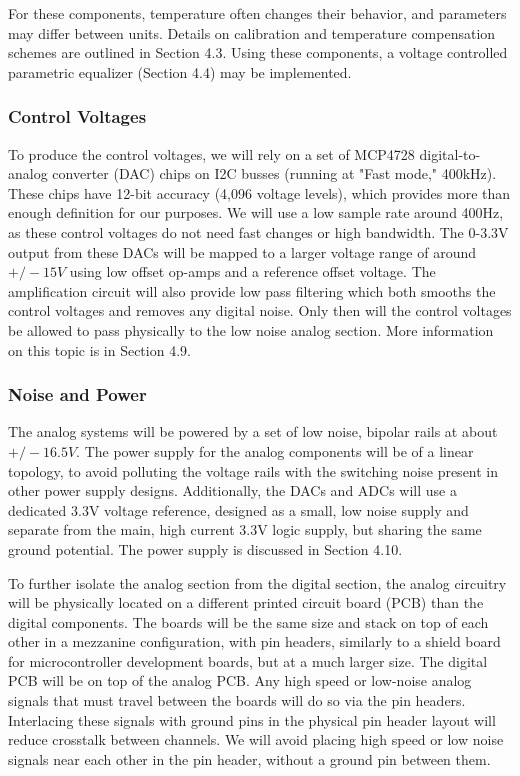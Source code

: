 \documentclass[11pt, letterpaper,titlepage]{article}
\begin{document}
For these components, temperature often changes their behavior, and parameters may differ between units. Details on calibration and temperature compensation schemes are outlined in Section 4.3. Using these components, a voltage controlled parametric equalizer (Section 4.4) may be implemented.


\subsubsection*{Control Voltages}
To produce the control voltages, we will rely on a set of MCP4728 digital-to-analog converter (DAC) chips on I2C busses (running at "Fast mode," 400kHz). These chips have 12-bit accuracy (4,096 voltage levels), which provides more than enough definition for our purposes. We will use a low sample rate around 400Hz, as these control voltages do not need fast changes or high bandwidth. The 0-3.3V output from these DACs will be mapped to a larger voltage range of around $+/- 15V$ using low offset op-amps and a reference offset voltage. The amplification circuit will also provide low pass filtering which both smooths the control voltages and removes any digital noise. Only then will the control voltages be allowed to pass physically to the low noise analog section. More information on this topic is in Section 4.9.

\subsubsection*{Noise and Power}
The analog systems will be powered by a set of low noise, bipolar rails at about $+/- 16.5V$. The power supply for the analog components will be of a linear topology, to avoid polluting the voltage rails with the switching noise present in other power supply designs. Additionally, the DACs and ADCs will use a dedicated 3.3V voltage reference, designed as a small, low noise supply and separate from the main, high current 3.3V logic supply, but sharing the same ground potential. The power supply is discussed in Section 4.10.

To further isolate the analog section from the digital section, the analog circuitry will be physically located on a different printed circuit board (PCB) than the digital components. The boards will be the same size and stack on top of each other in a mezzanine configuration, with pin headers, similarly to a shield board for microcontroller development boards, but at a much larger size. The digital PCB will be on top of the analog PCB. Any high speed or low-noise analog signals that must travel between the boards will do so via the pin headers. Interlacing these signals with ground pins in the physical pin header layout will reduce crosstalk between channels. We will avoid placing high speed or low noise signals near each other in the pin header, without a ground pin between them.
\end{document}

